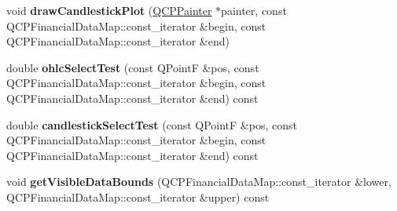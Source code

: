 \begin{DoxyCompactItemize}
void {\bfseries draw\+Candlestick\+Plot} (\mbox{\hyperlink{class_q_c_p_painter}{Q\+C\+P\+Painter}} $\ast$painter, const Q\+C\+P\+Financial\+Data\+Map\+::const\+\_\+iterator \&begin, const Q\+C\+P\+Financial\+Data\+Map\+::const\+\_\+iterator \&end)
\item 
\mbox{\label{class_q_c_p_financial_a9df2d86e6ad3b58b51798d720e0f4739}} 
double {\bfseries ohlc\+Select\+Test} (const Q\+PointF \&pos, const Q\+C\+P\+Financial\+Data\+Map\+::const\+\_\+iterator \&begin, const Q\+C\+P\+Financial\+Data\+Map\+::const\+\_\+iterator \&end) const
\item 
\mbox{\label{class_q_c_p_financial_a6fa1e18f18b37d3a0502b97d864a6d15}} 
double {\bfseries candlestick\+Select\+Test} (const Q\+PointF \&pos, const Q\+C\+P\+Financial\+Data\+Map\+::const\+\_\+iterator \&begin, const Q\+C\+P\+Financial\+Data\+Map\+::const\+\_\+iterator \&end) const
\item 
\mbox{\label{class_q_c_p_financial_ab74167a55319771c5da0e06406c2c2f2}} 
void {\bfseries get\+Visible\+Data\+Bounds} (Q\+C\+P\+Financial\+Data\+Map\+::const\+\_\+iterator \&lower, Q\+C\+P\+Financial\+Data\+Map\+::const\+\_\+iterator \&upper) const
\end{DoxyCompactItemize}
